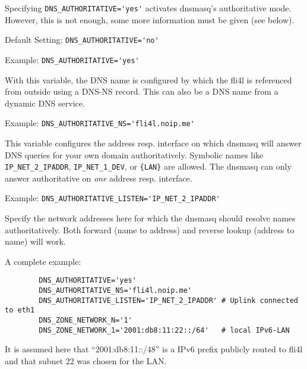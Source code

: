 \begin{description}


Specifying \verb+DNS_AUTHORITATIVE='yes'+ activates dnsmasq's authoritative
mode. However, this is not enough, some more information must be given
(see below).

Default Setting: \verb+DNS_AUTHORITATIVE='no'+

Example: \verb+DNS_AUTHORITATIVE='yes'+


With this variable, the DNS name is configured by which the fli4l is referenced
from outside using a DNS-NS record. This can also be a DNS name
from a dynamic DNS service.

Example: \verb+DNS_AUTHORITATIVE_NS='fli4l.noip.me'+


This variable configures the address resp. interface on which dnsmasq will
answer DNS queries for your own domain authoritatively. Symbolic names
like \verb+IP_NET_2_IPADDR+, \verb+IP_NET_1_DEV+, or \verb+{LAN}+ are allowed.
The dnsmasq can only answer authoritative on \emph{one} address resp. interface.


Example: \verb+DNS_AUTHORITATIVE_LISTEN='IP_NET_2_IPADDR'+


Specify the network addresses here for which the dnsmasq should resolve
names authoritatively. Both forward (name to address)
and reverse lookup (address to name) will work.

A complete example:

\begin{example}
\begin{verbatim}
        DNS_AUTHORITATIVE='yes'
        DNS_AUTHORITATIVE_NS='fli4l.noip.me'
        DNS_AUTHORITATIVE_LISTEN='IP_NET_2_IPADDR' # Uplink connected to eth1
        DNS_ZONE_NETWORK_N='1'
        DNS_ZONE_NETWORK_1='2001:db8:11:22::/64'   # local IPv6-LAN
\end{verbatim}
\end{example}

It is assumed here that ``2001:db8:11::/48'' is a IPv6 prefix publicly routed to fli4l
and that subnet 22 was chosen for the LAN.

\end{description}

